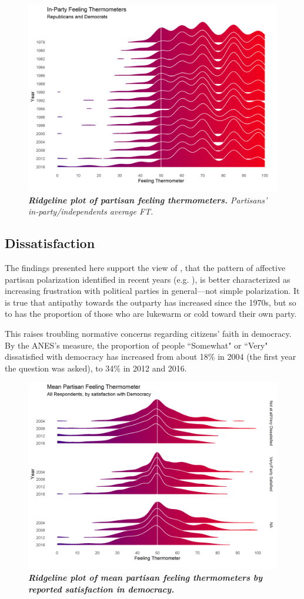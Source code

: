 \documentclass[12pt]{paper}
\begin{document}
\begin{figure}
\centering
\includegraphics[width=.6\textwidth]{cdf-ridge-ns.png}
\caption{\label{fig:ridge} \textit{\textbf{Ridgeline plot of partisan feeling thermometers.} Partisans' in-party/independents average FT.}}
\end{figure}


\subsection{Dissatisfaction}

The findings presented here support the view of \cite{klar2018affective}, that the pattern of  affective partisan polarization identified in recent years (e.g. \citet{iyengar2012affect}), is better characterized as increasing frustration with political parties in general---not simple polarization. It is true that antipathy towards the outparty has increased since the 1970s, but so to has the proportion of those who are lukewarm or cold toward their own party.

This raises troubling normative concerns regarding citizens' faith in democracy. By the ANES's measure, the proportion of people ``Somewhat" or ``Very" dissatisfied with democracy has increased from about 18\% in 2004 (the first year the question was asked), to 34\% in 2012 and 2016.

\begin{figure}
\centering
\includegraphics[width=.7\textwidth]{cdf-ridge-all-dis.png}
\caption{\label{fig:ridge-dis} \textit{\textbf{Ridgeline plot of mean partisan feeling thermometers by reported satisfaction in democracy.} %
}}
\end{figure}
\end{document}
